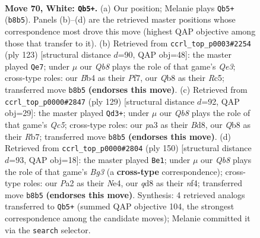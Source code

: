 \documentclass[11pt]{article}
\begin{document}
\clearpage

\begin{figure}[p]\centering
\begin{subfigure}{0.46\textwidth}\centering
\resizebox{\linewidth}{!}{%
\newchessgame
\chessboard[
  setfen={1Q1qk3/5p2/4bn2/7n/1Bp4P/p4pP1/P6K/4R3 w - - 8 70},
  showmover=false,
  pgfstyle=straightmove, color=movearrow, markmove={b8-b5}
]}
\caption{}
\end{subfigure}\hfill
\begin{subfigure}{0.46\textwidth}\centering
\resizebox{\linewidth}{!}{%
\newchessgame
\chessboard[
  setfen={8/5pk1/4q1p1/2r1N2p/B6P/2b1QPB1/6PK/8 b - - 2 62},
  showmover=false,
  pgfstyle=straightmove, color=movearrow, markmove={e6-e7}
]}
\caption{}
\end{subfigure}
\\[4pt]
\begin{subfigure}{0.46\textwidth}\centering
\resizebox{\linewidth}{!}{%
\newchessgame
\chessboard[
  setfen={3b2k1/1r6/3N3Q/4p3/ppq1P2P/8/PP6/1KB5 b - - 0 65},
  showmover=false,
  pgfstyle=straightmove, color=movearrow, markmove={c4-d3}
]}
\caption{}
\end{subfigure}\hfill
\begin{subfigure}{0.46\textwidth}\centering
\resizebox{\linewidth}{!}{%
\newchessgame
\chessboard[
  setfen={3b4/5qk1/Q5p1/4p2p/4Nn2/5PBP/6PK/8 w - - 3 76},
  showmover=false,
  pgfstyle=straightmove, color=movearrow, markmove={g3-e1}
]}
\caption{}
\end{subfigure}
\caption{\textbf{Move 70, White: \texttt{Qb5+}.} (a) Our position; Melanie plays \texttt{Qb5+} (\texttt{b8b5}). Panels (b)--(d) are the retrieved master positions whose correspondence most drove this move (highest QAP objective among those that transfer to it). (b) Retrieved from \texttt{ccrl\_top\_p0003\#2254} (ply 123) [structural distance $d$=90, QAP obj=48]: the master played \texttt{Qe7}; under $\mu$ our \emph{Qb8} plays the role of that game's \emph{Qe3}; cross-type roles: our \emph{B}b4 as their \emph{P}f7, our \emph{Q}b8 as their \emph{R}c5; transferred move \texttt{b8b5} \textbf{(endorses this move)}. (c) Retrieved from \texttt{ccrl\_top\_p0000\#2847} (ply 129) [structural distance $d$=92, QAP obj=29]: the master played \texttt{Qd3+}; under $\mu$ our \emph{Qb8} plays the role of that game's \emph{Qc5}; cross-type roles: our \emph{p}a3 as their \emph{B}d8, our \emph{Q}b8 as their \emph{R}b7; transferred move \texttt{b8b5} \textbf{(endorses this move)}. (d) Retrieved from \texttt{ccrl\_top\_p0000\#2804} (ply 150) [structural distance $d$=93, QAP obj=18]: the master played \texttt{Be1}; under $\mu$ our \emph{Qb8} plays the role of that game's \emph{Bg3} (a \textbf{cross-type} correspondence); cross-type roles: our \emph{P}a2 as their \emph{N}e4, our \emph{q}d8 as their \emph{n}f4; transferred move \texttt{b8b5} \textbf{(endorses this move)}. Synthesis: 4 retrieved analogs transferred to \texttt{Qb5+} (summed QAP objective 104, the strongest correspondence among the candidate moves); Melanie committed it via the \texttt{search} selector.}
\label{fig:thought-m138}
\end{figure}
\end{document}
